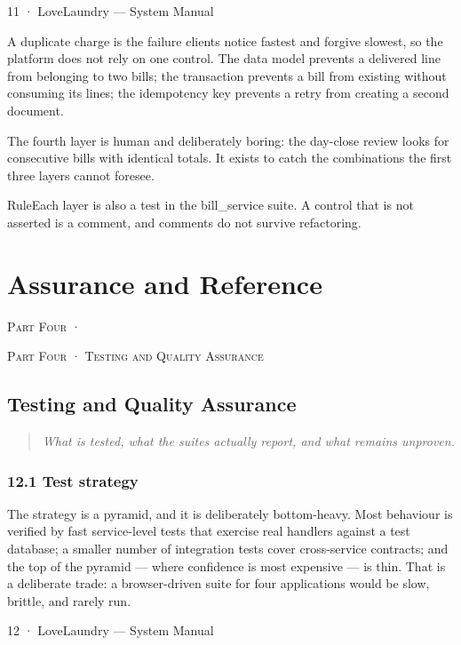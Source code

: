 \documentclass[11pt,a4paper,oneside]{book}
\begin{document}
11 · LoveLaundry — System Manual

A duplicate charge is the failure clients notice fastest and forgive slowest, so the platform does not rely on one control. The data model prevents a delivered line from belonging to two bills; the transaction prevents a bill from existing without consuming its lines; the idempotency key prevents a retry from creating a second document.

The fourth layer is human and deliberately boring: the day-close review looks for consecutive bills with identical totals. It exists to catch the combinations the first three layers cannot foresee.

\begin{notebox}RuleEach layer is also a test in the bill\_service suite. A control that is not asserted is a comment, and comments do not survive refactoring.\end{notebox}
\part{Assurance and Reference}
\textsc{\small\color{crimson}Part Four ·}\par\medskip
\textsc{\small\color{crimson}Part Four · Testing and Quality Assurance}\par\medskip
\chapter{Testing and Quality Assurance}
\begin{quote}\itshape What is tested, what the suites actually report, and what remains unproven.\end{quote}
\section{12.1 Test strategy}
The strategy is a pyramid, and it is deliberately bottom-heavy. Most behaviour is verified by fast service-level tests that exercise real handlers against a test database; a smaller number of integration tests cover cross-service contracts; and the top of the pyramid — where confidence is most expensive — is thin. That is a deliberate trade: a browser-driven suite for four applications would be slow, brittle, and rarely run.

12 · LoveLaundry — System Manual
\end{document}
